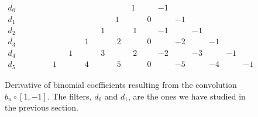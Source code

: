 \begin{figure}[h!]
	\centerline{
		$\begin{array}{ccccccccccccccccccccl}
				d_0 & ~ & ~ & ~ & ~    & ~    & ~    & ~    & ~    & ~~1  & ~~~ & -1  & ~  & ~  & ~  & ~  & ~  & ~ & ~ & ~ & \\
				d_1 & ~ & ~ & ~ & ~    & ~    & ~    & ~    & ~~1  & ~    & ~~0 & ~   & -1 & ~  & ~  & ~  & ~  & ~ & ~ & ~ & \\
				d_2 & ~ & ~ & ~ & ~    & ~    & ~    & ~~~1 & ~    & ~~~1 & ~~~ & -1  & ~  & -1 & ~  & ~  & ~  & ~ & ~ & ~ & \\
				d_3 & ~ & ~ & ~ & ~    & ~    & ~~~1 & ~    & ~~~2 & ~    & ~~0 & ~~~ & -2 & ~  & -1 & ~  & ~  & ~ & ~ & ~ & \\
				d_4 & ~ & ~ & ~ & ~    & ~~~1 & ~    & ~~~3 & ~    & ~~~2 & ~~~ & -2  & ~  & -3 & ~  & -1 & ~  & ~ & ~ & ~ & \\
				d_5 & ~ & ~ & ~ & ~~~1 & ~    & ~~~4 & ~    & ~~~5 & ~    & ~~0 & ~   & -5 & ~  & -4 & ~  & -1 & ~ & ~ & ~ &
			\end{array}$
	}
	\caption{Derivative of binomial coefficients resulting from the convolution $b_n \circ \left[1, -1\right]$. The filters, $d_0$ and $d_1$, are the ones we have studied in the previous section.}
	\label{fig:derivativepascaltriangle}
\end{figure}

